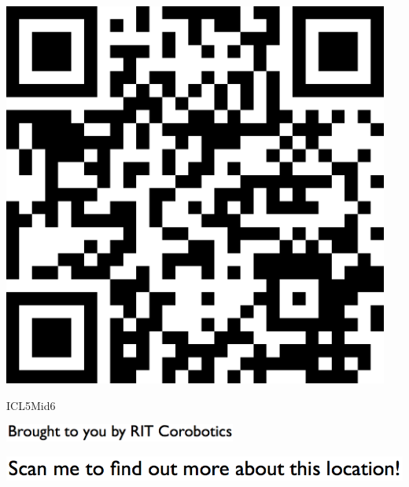 \documentclass[letterpaper]{article}
\begin{document}
 \begingroup 
 \centerline{\includegraphics[scale=1,width=5in,height=5in]{ICL5Mid6.png}} 
 \endgroup 
 \vspace*{\fill} 

 \hfill{\small ICL5Mid6} 

  \vspace{0.7in} 
 
 \centerline{\includegraphics[scale=1,width=3in]{text-bottom.png}} 
 
 \pagebreak 
{} 
 \vspace*{\fill} 
 
  \centerline{\includegraphics[scale=1,width=6in]{text-top.png}} 
 
 \vspace{0.5in} 
 
\end{document}
